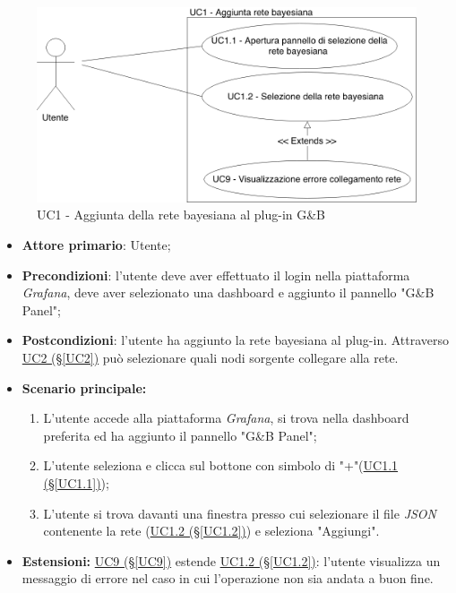 \begin{figure}[H]
	\begin{center}
		\includegraphics[scale=0.4]{./images/UC1.png}
		 \caption{UC1 - Aggiunta della rete bayesiana al plug-in G\&B}	
	\end{center}
\end{figure}
\begin{itemize}
	\item \textbf{Attore primario}: Utente;
	\item \textbf{Precondizioni}: l'utente deve aver effettuato il login nella piattaforma \textit{Grafana}, deve aver selezionato una dashboard e aggiunto il pannello "G\&B Panel";
	\item \textbf{Postcondizioni}: l'utente ha aggiunto la rete bayesiana al plug-in. Attraverso \hyperref[UC2]{UC2 (§\ref*{UC2})} può selezionare quali nodi sorgente collegare alla rete.
	\item \textbf{Scenario principale:}
	\begin{enumerate}
		\item L'utente accede alla piattaforma \textit{Grafana}, si trova nella dashboard preferita ed ha aggiunto il pannello "G\&B Panel";
		\item L'utente seleziona e clicca sul bottone con simbolo di "+"(\hyperref[UC1.1]{UC1.1 (§\ref*{UC1.1})});
		\item L'utente si trova davanti una finestra presso cui selezionare il file \textit{JSON} contenente la rete (\hyperref[UC1.2]{UC1.2 (§\ref*{UC1.2})}) e seleziona "Aggiungi".
	\end{enumerate}
	\item \textbf{Estensioni:} \hyperref[UC9]{UC9 (§\ref*{UC9})} estende \hyperref[UC1.2]{UC1.2 (§\ref*{UC1.2})}: l'utente visualizza un messaggio di errore nel caso in cui l'operazione non sia andata a buon fine.
\end{itemize}

